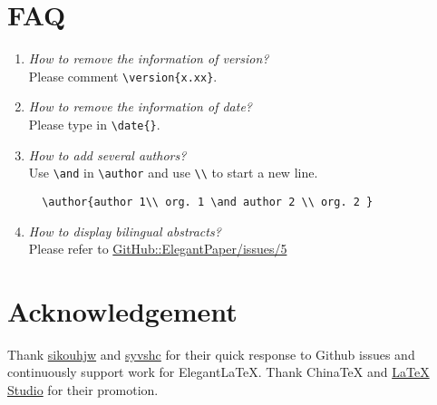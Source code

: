\documentclass[11pt,en]{elegantpaper}
\begin{document}
\section{FAQ}

\begin{enumerate}[label=\arabic*).]
  \item \textit{How to remove the information of version?}\\
  Please comment \lstinline|\version{x.xx}|.
  \item \textit{How to remove the information of date?}\\
  Please type in \lstinline|\date{}|.
  \item \textit{How to add several authors?}\\
  Use \lstinline{\and} in \lstinline{\author} and use \lstinline{\\} to start a new line.
  \begin{lstlisting}
  \author{author 1\\ org. 1 \and author 2 \\ org. 2 }
  \end{lstlisting}
  \item \textit{How to display bilingual abstracts?}\\
  Please refer to \href{https://github.com/ElegantLaTeX/ElegantPaper/issues/5}{GitHub::ElegantPaper/issues/5}
\end{enumerate}

\section{Acknowledgement}

Thank \href{https://github.com/sikouhjw}{sikouhjw} and \href{https://github.com/syvshc}{syvshc} for their quick response to Github issues and continuously support work for ElegantLaTeX. Thank ChinaTeX and \href{http://www.latexstudio.net/}{LaTeX Studio} for their promotion. 



\printbibliography[heading=bibintoc, title=\ebibname]

\appendix
\addappheadtotoc
\end{document}
